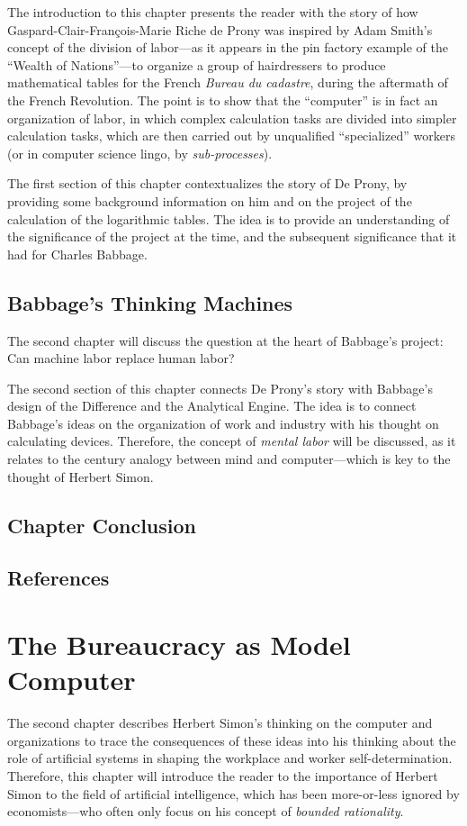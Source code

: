 \documentclass[version=last,draft=false,paper=A4,portrait,twoside=true,twocolumn=true,headinclude=false,footinclude=false,fontsize=12,BCOR=20mm,DIV=13,pagesize=auto,titlepage=firstiscover,mpinclude=false,open=right,chapterprefix=true,numbers=autoendperiod,headsepline=false,parskip=false]{scrbook}
\begin{document}
The introduction to this chapter presents the reader with the story of how
Gaspard-Clair-François-Marie Riche de Prony was inspired by Adam Smith's
concept of the division of labor---as it appears in the pin factory example
of the ``Wealth of Nations''---to organize a group of hairdressers to
produce mathematical tables for the French \emph{Bureau du cadastre}, during the
aftermath of the French Revolution. The point is to show that the
``computer'' is in fact an organization of labor, in which complex
calculation tasks are divided into simpler calculation tasks, which are
then carried out by unqualified ``specialized'' workers (or in computer
science lingo, by \emph{sub-processes}).

The first section of this chapter contextualizes the story of De Prony, by
providing some background information on him and on the project of the
calculation of the logarithmic tables. The idea is to provide an
understanding of the significance of the project at the time, and the
subsequent significance that it had for Charles Babbage.

\section{Babbage's Thinking Machines}
\label{sec:org054296b}

The second chapter will discuss the question at the heart of Babbage's
project: Can machine labor replace human labor?

The second section of this chapter connects De Prony's story with Babbage's
design of the Difference and the Analytical Engine. The idea is to connect
Babbage's ideas on the organization of work and industry with his thought
on calculating devices. Therefore, the concept of \emph{mental labor} will be
discussed, as it relates to the  century analogy between
mind and computer---which is key to the thought of Herbert Simon.   

\section{Chapter Conclusion}
\label{sec:orge796da5}
\section*{References}
\printbibliography[heading=none,keyword=chapter-2]
\chapter{The Bureaucracy as Model Computer}
\label{sec:org7049168}
The second chapter describes Herbert Simon's thinking on the computer and
organizations to trace the consequences of these ideas into his thinking
about the role of artificial systems in shaping the workplace and worker
self-determination. Therefore, this chapter will introduce the reader to
the importance of Herbert Simon to the field of artificial intelligence,
which has been more-or-less ignored by economists---who often only focus on
his concept of \emph{bounded rationality}.
\end{document}
